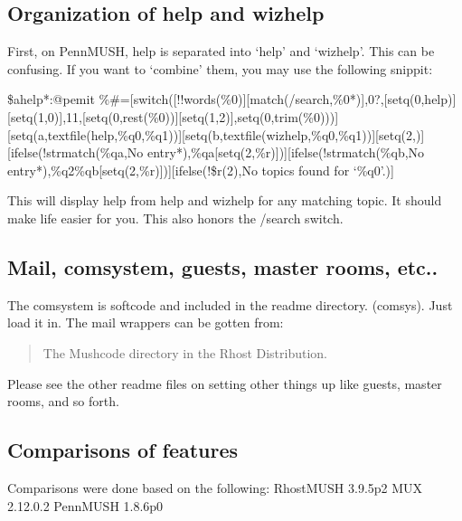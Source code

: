 \documentclass[letterpaper,10pt,english]{sphinxmanual}
\begin{document}
\subsection{Organization of help and wizhelp}
\label{\detokenize{differences:organization-of-help-and-wizhelp}}
\sphinxAtStartPar
First, on PennMUSH, help is separated into ‘help’ and ‘wizhelp’.  This can
be confusing. If you want to ‘combine’ them, you may use the following snippit:

\sphinxAtStartPar
\$ahelp*:@pemit \%\#={[}switch({[}!!words(\%0){]}{[}match(/search,\%0*){]},0?,{[}setq(0,help){]}{[}setq(1,0){]},11,{[}setq(0,rest(\%0)){]}{[}setq(1,2){]},setq(0,trim(\%0))){]}{[}setq(a,textfile(help,\%q0,\%q1)){]}{[}setq(b,textfile(wizhelp,\%q0,\%q1)){]}{[}setq(2,){]}{[}ifelse(!strmatch(\%qa,No entry*),\%qa{[}setq(2,\%r){]}){]}{[}ifelse(!strmatch(\%qb,No entry*),\%q2\%qb{[}setq(2,\%r){]}){]}{[}ifelse(!\$r(2),No topics found for ‘\%q0’.){]}

\sphinxAtStartPar
This will display help from help and wizhelp for any matching topic.  It
should make life easier for you.  This also honors the /search switch.


\subsection{Mail, comsystem, guests, master rooms, etc..}
\label{\detokenize{differences:mail-comsystem-guests-master-rooms-etc}}
\sphinxAtStartPar
The comsystem is softcode and included in the readme directory. (comsys).
Just load it in.  The mail wrappers can be gotten from:
\begin{quote}

\sphinxAtStartPar
The Mushcode directory in the Rhost Distribution.
\end{quote}

\sphinxAtStartPar
Please see the other readme files on setting other things up like
guests, master rooms, and so forth.


\subsection{Comparisons of features}
\label{\detokenize{differences:comparisons-of-features}}
\sphinxAtStartPar
Comparisons were done based on the following:
RhostMUSH 3.9.5p2
MUX 2.12.0.2
PennMUSH 1.8.6p0
\end{document}
